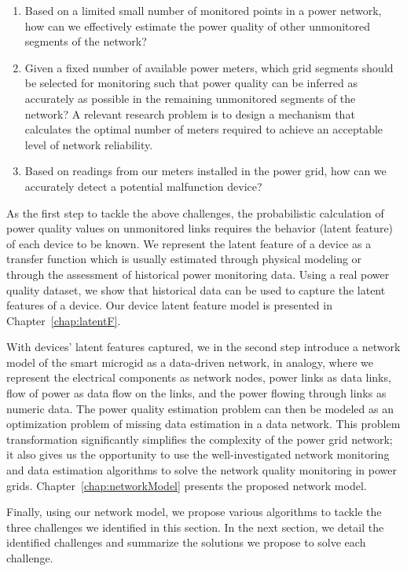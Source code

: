 \begin{enumerate}
\item Based on a limited small number of monitored points in a power network, how can we effectively estimate the power quality of other unmonitored segments of the network?

\item Given a fixed number of available power meters, which grid segments should be selected for monitoring such that power quality can be inferred as accurately as possible in the remaining unmonitored segments of the network? A relevant research problem is to design a mechanism that calculates the optimal number of meters required to achieve an acceptable level of network reliability.

\item Based on readings from our meters installed in the power grid, how can we accurately detect a potential malfunction device?

\end{enumerate}

As the first step to tackle the above challenges, the probabilistic calculation of power quality values on unmonitored links requires the behavior (latent feature) of each device to be known. We represent the latent feature of a device as a transfer function which is usually estimated through physical modeling or through the assessment of historical power monitoring data. Using a real power quality dataset, we show that historical data can be used to capture the latent features of a device. Our device latent feature model is presented in Chapter~\ref{chap:latentF}.

With devices' latent features captured, we in the second step introduce a network model of the smart microgid as a data-driven network, in analogy, where we represent the electrical components as network nodes, power links as data links, flow of power as data flow on the links, and the power flowing through links as numeric data. The power quality estimation problem can then be modeled as an optimization problem of missing data estimation in a data network. This problem transformation significantly simplifies the complexity of the power grid network; it also gives us the opportunity to use the well-investigated network monitoring and data estimation algorithms to solve the network quality monitoring in power grids. Chapter~\ref{chap:networkModel} presents the proposed network model.

Finally, using our network model, we propose various algorithms to tackle the three challenges we identified in this section. In the next section, we detail the identified challenges and summarize the solutions we propose to solve each challenge.

